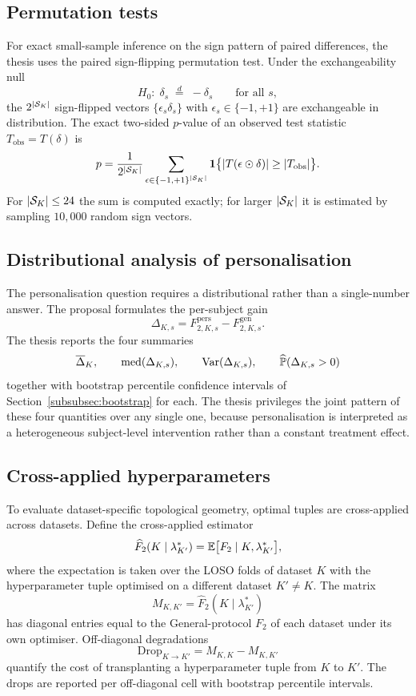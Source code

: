 \subsection{Permutation tests}
\label{subsubsec:permutation}

For exact small-sample inference on the sign pattern of paired differences, the thesis uses the paired sign-flipping permutation test. Under the exchangeability null
\[
  H_0\colon\;\delta_s\;\overset{d}{=}\;-\delta_s\qquad\text{for all } s,
\]
the $2^{|\mathcal{S}_K|}$ sign-flipped vectors $\{\epsilon_s\delta_s\}$ with $\epsilon_s\in\{-1,+1\}$ are exchangeable in distribution. The exact two-sided $p$-value of an observed test statistic $T_{\mathrm{obs}}=T(\delta)$ is
\begin{equation}
  p=\frac{1}{2^{|\mathcal{S}_K|}}\sum_{\epsilon\in\{-1,+1\}^{|\mathcal{S}_K|}}\mathbf{1}\bigl\{|T(\epsilon\odot\delta)|\geq|T_{\mathrm{obs}}|\bigr\}.
  \label{eq:permutation}
\end{equation}
For $|\mathcal{S}_K|\leq 24$ the sum is computed exactly; for larger $|\mathcal{S}_K|$ it is estimated by sampling $10{,}000$ random sign vectors.

\subsection{Distributional analysis of personalisation}
\label{subsubsec:dist-pers}

The personalisation question requires a distributional rather than a single-number answer. The proposal formulates the per-subject gain
\[
  \Delta_{K,s}=F_{2,K,s}^{\mathrm{pers}}-F_{2,K,s}^{\mathrm{gen}}.
\]
The thesis reports the four summaries
\[
  \overline{\Delta}_K,
  \qquad
  \mathrm{med}(\Delta_{K,s}),
  \qquad
  \operatorname{Var}(\Delta_{K,s}),
  \qquad
  \widehat{\mathbb{P}}(\Delta_{K,s}>0)
\]
together with bootstrap percentile confidence intervals of Section~\ref{subsubsec:bootstrap} for each. The thesis privileges the joint pattern of these four quantities over any single one, because personalisation is interpreted as a heterogeneous subject-level intervention rather than a constant treatment effect.

\subsection{Cross-applied hyperparameters}
\label{subsubsec:cross-applied}

To evaluate dataset-specific topological geometry, optimal tuples are cross-applied across datasets. Define the cross-applied estimator
\[
  \widehat F_2(K\mid\lambda^*_{K'})=\mathbb{E}\bigl[F_2\mid K,\lambda^*_{K'}\bigr],
\]
where the expectation is taken over the LOSO folds of dataset $K$ with the hyperparameter tuple optimised on a different dataset $K'\neq K$. The matrix
\[
  M_{K,K'}=\widehat F_2(K\mid\lambda^*_{K'})
\]
has diagonal entries equal to the General-protocol $F_2$ of each dataset under its own optimiser. Off-diagonal degradations
\[
  \mathrm{Drop}_{K\to K'}=M_{K,K}-M_{K,K'}
\]
quantify the cost of transplanting a hyperparameter tuple from $K$ to $K'$. The drops are reported per off-diagonal cell with bootstrap percentile intervals.

